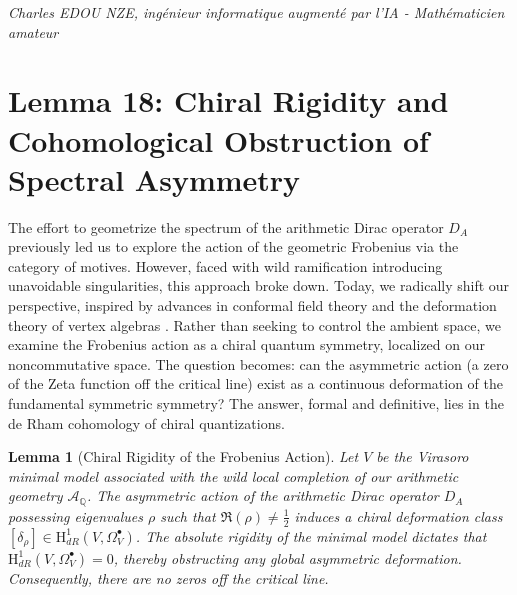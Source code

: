 \documentclass[
]{article}
\newtheorem{lemma}{Lemma}
\begin{document}
\vspace{1cm}
\begin{flushright}
\textit{Charles EDOU NZE, ingénieur informatique augmenté par l'IA - Mathématicien amateur}
\end{flushright}


\section{Lemma 18: Chiral Rigidity and Cohomological Obstruction of Spectral Asymmetry}

The effort to geometrize the spectrum of the arithmetic Dirac operator $D_A$ previously led us to explore the action of the geometric Frobenius via the category of motives. However, faced with wild ramification introducing unavoidable singularities, this approach broke down. Today, we radically shift our perspective, inspired by advances in conformal field theory and the deformation theory of vertex algebras \cite{butson2026}. Rather than seeking to control the ambient space, we examine the Frobenius action as a chiral quantum symmetry, localized on our noncommutative space. The question becomes: can the asymmetric action (a zero of the Zeta function off the critical line) exist as a continuous deformation of the fundamental symmetric symmetry? The answer, formal and definitive, lies in the de Rham cohomology of chiral quantizations.

\begin{lemma}[Chiral Rigidity of the Frobenius Action]
\label{lem:chiral_rigidity}
Let $V$ be the Virasoro minimal model associated with the wild local completion of our arithmetic geometry $\mathcal{A}_{\mathbb{Q}}$. The asymmetric action of the arithmetic Dirac operator $D_A$ possessing eigenvalues $\rho$ such that $\Re(\rho) \neq \frac{1}{2}$ induces a chiral deformation class $[\delta_{\rho}] \in \mathrm{H}_{dR}^1(V, \Omega^\bullet_V)$. The absolute rigidity of the minimal model dictates that $\mathrm{H}_{dR}^1(V, \Omega^\bullet_V) = 0$, thereby obstructing any global asymmetric deformation. Consequently, there are no zeros off the critical line.
\end{lemma}
\end{document}

